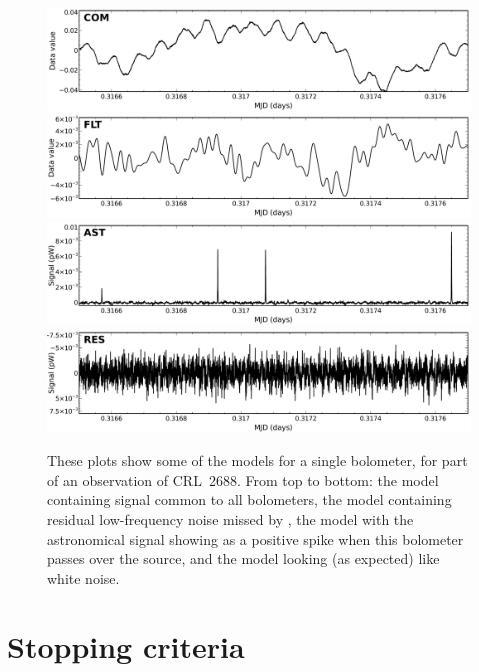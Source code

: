 \begin{figure}
\begin{center}
  \includegraphics[width=\linewidth]{sc21_com} \\
  \includegraphics[width=\linewidth]{sc21_flt} \\
  \includegraphics[width=\linewidth]{sc21_ast} \\
  \includegraphics[width=\linewidth]{sc21_res} \\
\end{center}
\caption[Iterative models in the time domain]{\small These plots show
some of the models for a single bolometer, for part of an
observation of CRL~2688. From top to bottom: the  model
containing signal common to all bolometers, the  model
containing residual low-frequency noise missed by , the
 model with the astronomical signal showing as a positive
spike when this bolometer passes over the source, and the 
model looking (as expected) like white noise.}
\label{fig:itercomp}
\end{figure}


\section{Stopping criteria}
\label{sec:converge}


